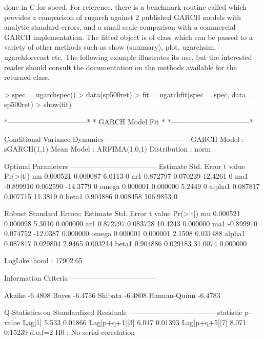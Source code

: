 done in C for speed. For reference, there is a benchmark routine called \verb@ugarchbench@
which provides a comparison of rugarch against 2 published GARCH models with analytic
standard errors, and a small scale comparison with a commercial GARCH implementation.
The fitted object is of class \verb@uGARCHfit@ which can be passed to a variety
of other methods such as show (summary), plot, ugarchsim, ugarchforecast etc.
The following example illustrates its use, but the interested reader should
consult the documentation on the methods available for the returned class.
\begin{Schunk}
\begin{Sinput}
> spec = ugarchspec()
> data(sp500ret)
> fit = ugarchfit(spec = spec, data = sp500ret)
> show(fit)
\end{Sinput}
\begin{Soutput}
*---------------------------------*
*          GARCH Model Fit        *
*---------------------------------*

Conditional Variance Dynamics 	
-----------------------------------
GARCH Model	: sGARCH(1,1)
Mean Model	: ARFIMA(1,0,1)
Distribution	: norm

Optimal Parameters
------------------------------------
        Estimate  Std. Error  t value Pr(>|t|)
mu      0.000521    0.000087   6.0113        0
ar1     0.872797    0.070239  12.4261        0
ma1    -0.899910    0.062590 -14.3779        0
omega   0.000001    0.000000   5.2449        0
alpha1  0.087817    0.007715  11.3819        0
beta1   0.904886    0.008458 106.9853        0

Robust Standard Errors:
        Estimate  Std. Error  t value Pr(>|t|)
mu      0.000521    0.000098   5.3010 0.000000
ar1     0.872797    0.083728  10.4243 0.000000
ma1    -0.899910    0.074752 -12.0387 0.000000
omega   0.000001    0.000001   2.1508 0.031488
alpha1  0.087817    0.029804   2.9465 0.003214
beta1   0.904886    0.029183  31.0074 0.000000

LogLikelihood : 17902.65

Information Criteria
------------------------------------

Akaike       -6.4808
Bayes        -6.4736
Shibata      -6.4808
Hannan-Quinn -6.4783

Q-Statistics on Standardized Residuals
------------------------------------
              statistic p-value
Lag[1]            5.533 0.01866
Lag[p+q+1][3]     6.047 0.01393
Lag[p+q+5][7]     8.071 0.15239
d.o.f=2
H0 : No serial correlation


\end{Soutput}
\end{Schunk}
